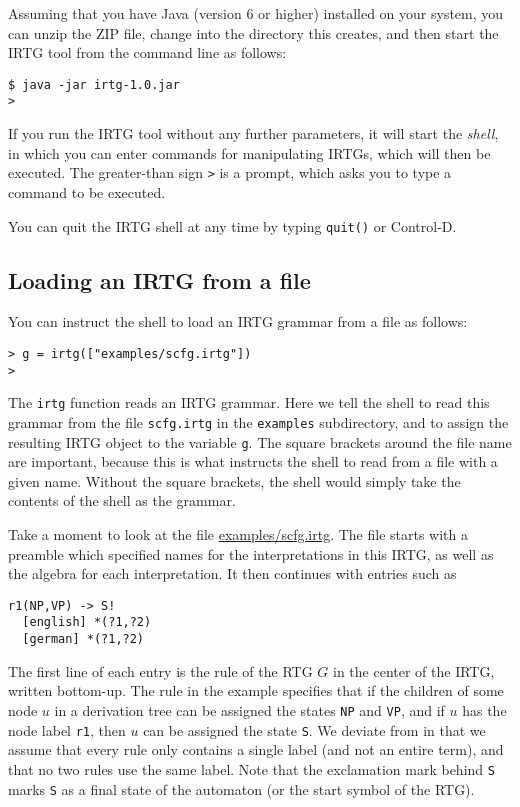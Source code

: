 \documentclass[11pt]{article}
\begin{document}
Assuming that you have Java (version 6 or higher) installed on your
system, you can unzip the ZIP file, change into the directory this
creates, and then start the IRTG tool from the command line as
follows:

\begin{verbatim}
$ java -jar irtg-1.0.jar
>
\end{verbatim}

If you run the IRTG tool without any further parameters, it will
start the \emph{shell}, in which you can enter commands for
manipulating IRTGs, which will then be executed. The greater-than sign
\verb?>? is a prompt, which asks you to type a command to be
executed.

You can quit the IRTG shell at any time by typing \verb?quit()? or
Control-D.



\subsection{Loading an IRTG from a file}

You can instruct the shell to load an IRTG grammar from a file as
follows:

\begin{verbatim}
> g = irtg(["examples/scfg.irtg"])
>
\end{verbatim}

The \verb?irtg? function reads an IRTG grammar. Here we tell the shell
to read this grammar from the file \verb?scfg.irtg? in the
\verb?examples? subdirectory, and to assign the resulting IRTG object
to the variable \verb?g?. The square brackets around the file name are
important, because this is what instructs the shell to read from a
file with a given name. Without the square brackets, the shell would
simply take the contents of the shell as the grammar.

Take a moment to look at the file \url{examples/scfg.irtg}. The file
starts with a preamble which specified names for the interpretations
in this IRTG, as well as the algebra for each interpretation. It then
continues with entries such as

\begin{verbatim}
r1(NP,VP) -> S!
  [english] *(?1,?2)
  [german] *(?1,?2)
\end{verbatim}

The first line of each entry is the rule of the RTG $G$ in the center of
the IRTG, written bottom-up. The rule in the example specifies that if
the children of some node $u$ in a derivation tree can be assigned the
states \verb?NP? and \verb?VP?, and if $u$ has the node label
\verb?r1?, then $u$ can be assigned the state \verb?S?. We deviate
from \cite{koller11} in that we assume that every rule only contains a
single label (and not an entire term), and that no two rules use the
same label. Note that the exclamation mark behind \verb?S? marks
\verb?S? as a final state of the automaton (or the start symbol of the
RTG).
\end{document}
